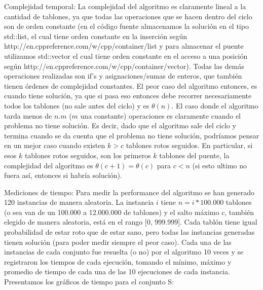 \documentclass{article}
\begin{document}
\vspace{1.5cm}
{\noindent \Huge Complejidad temporal:}
\newline \newline
La complejidad del algoritmo es claramente lineal a la cantidad de tablones, ya que todas las operaciones que se hacen dentro del ciclo son de orden constante (en el c\'odigo fuente almacenamos la soluci\'on en el tipo std::list, el cual tiene orden constante en la inserci\'on seg\'un http://en.cppreference.com/w/cpp/container/list y para almacenar el puente utilizamos std::vector el cual tiene orden constante en el acceso a una posici\'on seg\'un http://en.cppreference.com/w/cpp/container/vector). Todas las dem\'as operaciones realizadas son if's y asignaciones/sumas de enteros, que tambi\'en tienen \'ordenes de complejidad constantes.
\newline El peor caso del algoritmo entonces, es cuando tiene soluci\'on, ya que si pasa eso entonces debe recorrer necesariamente todos los tablones (no sale antes del ciclo) y es $\theta (n)$.
\newline El caso donde el algoritmo tarda menos de $n.m$ ($m$ una constante) operaciones es claramente cuando el problema no tiene soluci\'on. Es decir, dado que el algoritmo sale del ciclo y termina cuando se da cuenta que el problema no tiene soluci\'on, podr\'iamos pensar en un mejor caso cuando existen $k > c$ tablones rotos seguidos. En particular, si esos $k$ tablones rotos seguidos, son los primeros $k$ tablones del puente, la complejidad del algoritmo es $\theta(c + 1) = \theta(c)$ para $c < n$ (si esto ultimo no fuera as\'i, entonces si habr\'ia soluci\'on).

\vspace{0.6cm}
{\noindent \Huge Mediciones de tiempo:}
\newline \newline Para medir la performance del algoritmo se han generado 120 instancias de manera aleatoria. La instancia $i$ tiene $n = i * 100.000$ tablones (o sea van de un 100.000 a 12.000.000 de tablones) y el salto m\'aximo $c$, tambi\'en elegido de manera aleatoria, est\'a en el rango [0, 999.999].
\newline Cada tabl\'on tiene igual probabilidad de estar roto que de estar sano, pero todas las instancias generadas tienen soluci\'on (para poder medir siempre el peor caso).
\newline Cada una de las instancias de cada conjunto fue resuelta (o no) por el algoritmo 10 veces y se registraron los tiempos de cada ejecuci\'on, tomando el m\'inimo, m\'aximo y promedio de tiempo de cada una de las 10 ejecuciones de cada instancia.
\newline \newline Presentamos los gr\'aficos de tiempo para el conjunto S:
\end{document}
